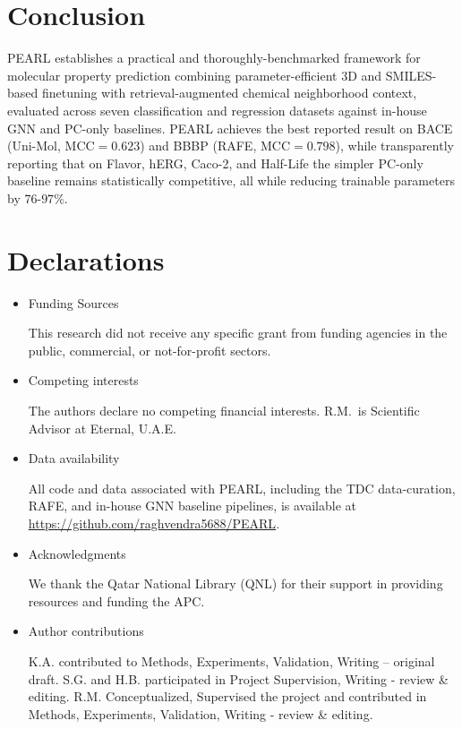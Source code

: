\documentclass[final,1p,times]{elsarticle}
\begin{document}
\section{Conclusion}
PEARL establishes a practical and thoroughly-benchmarked framework for molecular property prediction combining parameter-efficient 3D and SMILES-based finetuning with retrieval-augmented chemical neighborhood context, evaluated across seven classification and regression datasets against in-house GNN and PC-only baselines. PEARL achieves the best reported result on BACE (Uni-Mol, MCC$=0.623$) and BBBP (RAFE, MCC$=0.798$), while transparently reporting that on Flavor, hERG, Caco-2, and Half-Life the simpler PC-only baseline remains statistically competitive, all while reducing trainable parameters by $76$-$97\%$.

\section*{Declarations}
\begin{itemize}
\item Funding Sources

This research did not receive any specific grant from funding agencies in the public, commercial, or not-for-profit sectors.

\item Competing interests

The authors declare no competing financial interests. R.M.\ is Scientific Advisor at Eternal, U.A.E.

\item Data availability

All code and data associated with PEARL, including the TDC data-curation, RAFE, and in-house GNN baseline pipelines, is available at \url{https://github.com/raghvendra5688/PEARL}.

\item Acknowledgments

We thank the Qatar National Library (QNL) for their support in providing resources and funding the APC.

\item Author contributions

K.A. contributed to Methods, Experiments, Validation, Writing -- original draft. S.G. and H.B. participated in Project Supervision, Writing - review \& editing. R.M. Conceptualized, Supervised the project and contributed in Methods, Experiments, Validation, Writing - review \& editing.
\end{itemize}
\end{document}
